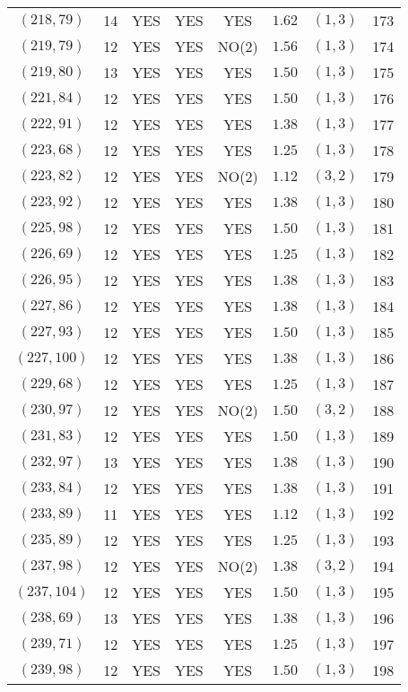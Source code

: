 \begin{longtable}{|c|c|c|c|c|c|c|c|}
$(218,79)$ & 14 & YES & YES & YES & $1.62$ & $(1,3)$ & 173\\
$(219,79)$ & 12 & YES & YES & NO(2) & $1.56$ & $(1,3)$ & 174\\
$(219,80)$ & 13 & YES & YES & YES & $1.50$ & $(1,3)$ & 175\\
$(221,84)$ & 12 & YES & YES & YES & $1.50$ & $(1,3)$ & 176\\
$(222,91)$ & 12 & YES & YES & YES & $1.38$ & $(1,3)$ & 177\\
$(223,68)$ & 12 & YES & YES & YES & $1.25$ & $(1,3)$ & 178\\
$(223,82)$ & 12 & YES & YES & NO(2) & $1.12$ & $(3,2)$ & 179\\
$(223,92)$ & 12 & YES & YES & YES & $1.38$ & $(1,3)$ & 180\\
$(225,98)$ & 12 & YES & YES & YES & $1.50$ & $(1,3)$ & 181\\
$(226,69)$ & 12 & YES & YES & YES & $1.25$ & $(1,3)$ & 182\\
$(226,95)$ & 12 & YES & YES & YES & $1.38$ & $(1,3)$ & 183\\
$(227,86)$ & 12 & YES & YES & YES & $1.38$ & $(1,3)$ & 184\\
$(227,93)$ & 12 & YES & YES & YES & $1.50$ & $(1,3)$ & 185\\
$(227,100)$ & 12 & YES & YES & YES & $1.38$ & $(1,3)$ & 186\\
$(229,68)$ & 12 & YES & YES & YES & $1.25$ & $(1,3)$ & 187\\
$(230,97)$ & 12 & YES & YES & NO(2) & $1.50$ & $(3,2)$ & 188\\
$(231,83)$ & 12 & YES & YES & YES & $1.50$ & $(1,3)$ & 189\\
$(232,97)$ & 13 & YES & YES & YES & $1.38$ & $(1,3)$ & 190\\
$(233,84)$ & 12 & YES & YES & YES & $1.38$ & $(1,3)$ & 191\\
$(233,89)$ & 11 & YES & YES & YES & $1.12$ & $(1,3)$ & 192\\
$(235,89)$ & 12 & YES & YES & YES & $1.25$ & $(1,3)$ & 193\\
$(237,98)$ & 12 & YES & YES & NO(2) & $1.38$ & $(3,2)$ & 194\\
$(237,104)$ & 12 & YES & YES & YES & $1.50$ & $(1,3)$ & 195\\
$(238,69)$ & 13 & YES & YES & YES & $1.38$ & $(1,3)$ & 196\\
$(239,71)$ & 12 & YES & YES & YES & $1.25$ & $(1,3)$ & 197\\
$(239,98)$ & 12 & YES & YES & YES & $1.50$ & $(1,3)$ & 198\\

\end{longtable}
